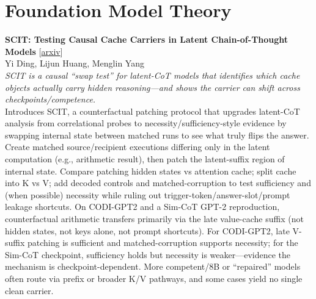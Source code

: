 \documentclass[12pt,letterpaper]{article}
\begin{document}
\medskip


\section*{Foundation Model Theory}

{\small\textbf{SCIT: Testing Causal Cache Carriers in Latent Chain-of-Thought Models}} {\scriptsize[\href{https://arxiv.org/abs/2608.27265}{arxiv}]}\\
{\scriptsize Yi Ding, Lijun Huang, Menglin Yang}\\

{\small\textit{SCIT is a causal ``swap test'' for latent-CoT models that identifies which cache objects actually carry hidden reasoning---and shows the carrier can shift across checkpoints/competence.}}\\[1pt]
{\footnotesize Introduces SCIT, a counterfactual patching protocol that upgrades latent-CoT analysis from correlational probes to necessity/sufficiency-style evidence by swapping internal state between matched runs to see what truly flips the answer. Create matched source/recipient executions differing only in the latent computation (e.g., arithmetic result), then patch the latent-suffix region of internal state. Compare patching hidden states vs attention cache; split cache into K vs V; add decoded controls and matched-corruption to test sufficiency and (when possible) necessity while ruling out trigger-token/answer-slot/prompt leakage shortcuts. On CODI-GPT2 and a Sim-CoT GPT-2 reproduction, counterfactual arithmetic transfers primarily via the late value-cache suffix (not hidden states, not keys alone, not prompt shortcuts). For CODI-GPT2, late V-suffix patching is sufficient and matched-corruption supports necessity; for the Sim-CoT checkpoint, sufficiency holds but necessity is weaker---evidence the mechanism is checkpoint-dependent. More competent/8B or ``repaired'' models often route via prefix or broader K/V pathways, and some cases yield no single clean carrier.}

\medskip
\end{document}
